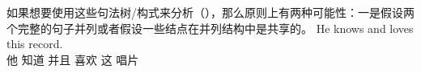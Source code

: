 \begin{exe}
\begin{xlist}[iv.]
\begin{exe}
\begin{xlist}[iv.]
如果想要使用这些句法树/构式来分析（），那么原则上有两种可能性：一是假设两个完整的句子并列或者假设一些结点在并列结构中是共享的。
\ea
\label{Beispiel-he-knows-and-loves}
\gll He knows and loves this record.\\
     他 知道 并且 喜欢 这 唱片\\
\z
%
%
%


\end{xlist}
\end{exe}
\end{xlist}
\end{exe}
